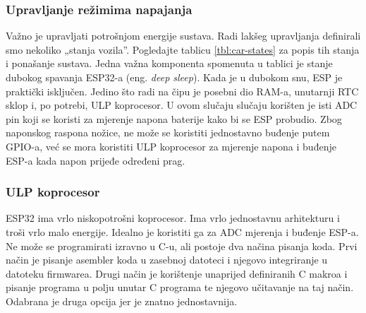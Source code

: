 \subsubsection{Upravljanje režimima napajanja}

Važno je upravljati potrošnjom energije sustava. Radi lakšeg upravljanja definirali smo nekoliko „stanja vozila”. 
Pogledajte tablicu \ref{tbl:car-states} za popis tih stanja i ponašanje sustava. 
Jedna važna komponenta spomenuta u tablici je stanje dubokog spavanja ESP32-a (eng. \textit{deep sleep}). 
Kada je u dubokom snu, ESP je praktički isključen. Jedino što radi na čipu je posebni dio RAM-a, unutarnji RTC sklop i, po potrebi, ULP koprocesor. 
U ovom slučaju slučaju korišten je isti ADC pin koji se koristi za mjerenje napona baterije kako bi se ESP probudio. 
Zbog naponskog raspona nožice, ne može se koristiti jednostavno buđenje putem GPIO-a, već se mora koristiti ULP koprocesor za mjerenje napona i buđenje ESP-a kada napon prijeđe određeni prag.

\subsubsection{ULP koprocesor}

ESP32 ima vrlo niskopotrošni koprocesor. Ima vrlo jednostavnu arhitekturu i troši vrlo malo energije. Idealno je koristiti ga za ADC mjerenja i buđenje ESP-a. 
Ne može se programirati izravno u C-u, ali postoje dva načina pisanja koda. 
Prvi način je pisanje asembler koda u zasebnoj datoteci i njegovo integriranje u datoteku firmwarea. 
Drugi način je korištenje unaprijed definiranih C makroa i pisanje programa u polju unutar C programa te njegovo učitavanje na taj način. 
Odabrana je druga opcija jer je znatno jednostavnija.

